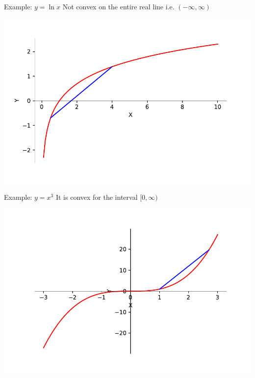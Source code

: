 \documentclass{beamer}
\begin{document}
	\begin{frame}{Example: $y = \ln x$}
	Not convex on the entire real line i.e. $(-\infty, \infty)$
	\begin{center}
	\includegraphics[scale=0.5]{y-logx}
	\end{center}
	\end{frame}

	\begin{frame}{Example: $y = x^3$}
	It is convex for the interval $[0,\infty)$
	\begin{center}
	\includegraphics[scale=0.5]{y-x3_pos}
	\end{center}
	\end{frame}
\end{document}

